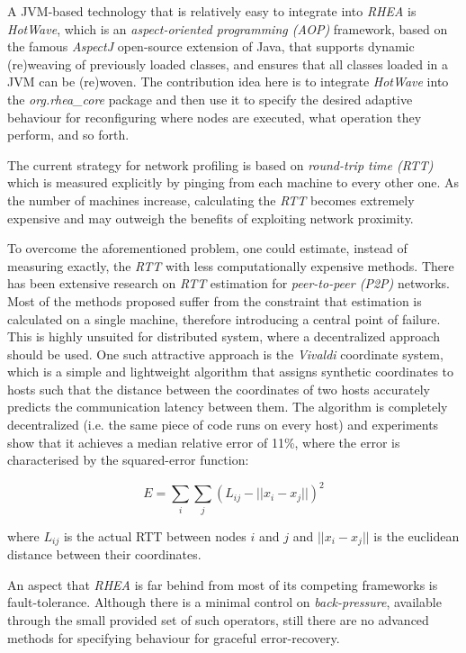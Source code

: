 \documentclass{dithesis}
\begin{document}
A JVM-based technology that is relatively easy to integrate into \textit{RHEA} is \textit{HotWave}\cite{reconf_java}, which is an \textit{aspect-oriented programming (AOP)} framework, based on the famous \textit{AspectJ}\cite{aspect} open-source extension of Java, that supports dynamic (re)weaving of previously loaded classes, and ensures that all classes loaded in a JVM can be (re)woven. The contribution idea here is to integrate \textit{HotWave} into the \textit{org.rhea\_core} package and then use it to specify the desired adaptive behaviour for reconfiguring where nodes are executed, what operation they perform, and so forth.


The current strategy for network profiling is based on \textit{round-trip time (RTT)} which is measured explicitly by pinging from each machine to every other one. As the number of machines increase, calculating the \textit{RTT} becomes extremely expensive and may outweigh the benefits of exploiting network proximity. 

To overcome the aforementioned problem, one could estimate, instead of measuring exactly, the \textit{RTT} with less computationally expensive methods. There has been extensive research on \textit{RTT} estimation for \textit{peer-to-peer (P2P)} networks\cite{rtt_survey}. Most of the methods proposed suffer from the constraint that estimation is calculated on a single machine, therefore introducing a central point of failure. This is highly unsuited for distributed system, where a decentralized approach should be used. One such attractive approach is the \textit{Vivaldi} coordinate system\cite{vivaldi}, which is a simple and lightweight algorithm that assigns synthetic coordinates to hosts such that the distance between the coordinates of two hosts accurately predicts the communication latency between them. The algorithm is completely decentralized (i.e. the same piece of code runs on every host) and experiments show that it achieves a median relative error of 11\%, where the error is characterised by the squared-error function:

\[ E =  \sum_i \sum_j (L_{ij}-||x_i - x_j||)^2  \]

where $L_{ij}$ is the actual RTT between nodes $i$ and $j$ and $||x_i - x_j||$ is the euclidean distance between their coordinates.


An aspect that \textit{RHEA} is far behind from most of its competing frameworks is fault-tolerance. Although there is a minimal control on \textit{back-pressure}, available through the small provided set of such operators, still there are no advanced methods for specifying behaviour for graceful error-recovery.
\end{document}

